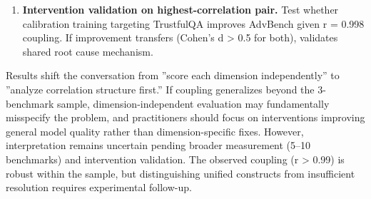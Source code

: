 \begin{enumerate}
\item \textbf{Intervention validation on highest-correlation pair.} Test whether calibration training targeting TrustfulQA improves AdvBench given r = 0.998 coupling. If improvement transfers (Cohen's d > 0.5 for both), validates shared root cause mechanism.
\end{enumerate}

Results shift the conversation from ''score each dimension independently'' to ''analyze correlation structure first.'' If coupling generalizes beyond the 3-benchmark sample, dimension-independent evaluation may fundamentally misspecify the problem, and practitioners should focus on interventions improving general model quality rather than dimension-specific fixes. However, interpretation remains uncertain pending broader measurement (5--10 benchmarks) and intervention validation. The observed coupling (r > 0.99) is robust within the sample, but distinguishing unified constructs from insufficient resolution requires experimental follow-up.
